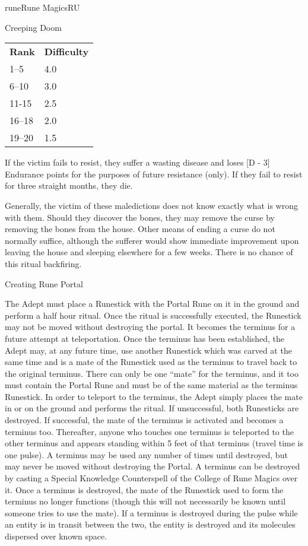 \begin{college}[1.1]{rune}{Rune Magics}{RU}
\begin{ritual}[R-2]{Creeping Doom}
\begin{effects}
\begin{tabular}{ll}
\textbf{Rank} & \textbf{Difficulty} \\
1--5	& 4.0 \\
6--10	& 3.0 \\
11-15	& 2.5 \\
16--18	& 2.0 \\
19--20	& 1.5 \\
\end{tabular}

If the victim fails to resist, they suffer a wasting disease and loses
[D - 3] Endurance points for the purposes of future resistance (only).
If they fail to resist for three straight months, they die.

Generally, the victim of these maledictions does not know exactly what
is wrong with them.  Should they discover the bones, they may remove
the curse by removing the bones from the house.  Other means of ending
a curse do not normally suffice, although the sufferer would show
immediate improvement upon leaving the house and sleeping elsewhere
for a few weeks.  There is no chance of this ritual backfiring.
\end{effects}
\end{ritual}

\begin{ritual}[R-3]{Creating Rune Portal}

\begin{effects}
The Adept must place a Runestick with the Portal Rune on it in the
ground and perform a half hour ritual.  Once the ritual is
successfully executed, the Runestick may not be moved without
destroying the portal.  It becomes the terminus for a future attempt
at teleportation. Once the terminus has been established, the Adept
may, at any future time, use another Runestick which was carved at the
same time and is a mate of the Runestick used as the terminus to
travel back to the original terminus.  There can only be one ``mate''
for the terminus, and it too must contain the Portal Rune and must be
of the same material as the terminus Runestick. In order to teleport
to the terminus, the Adept simply places the mate in or on the ground
and performs the ritual.  If unsuccessful, both Runesticks are
destroyed.  If successful, the mate of the terminus is activated and
becomes a terminus too.  Thereafter, anyone who touches one terminus
is teleported to the other terminus and appears standing within 5 feet
of that terminus (travel time is one pulse). A terminus may be used
any number of times until destroyed, but may never be moved without
destroying the Portal. A terminus can be destroyed by casting a
Special Knowledge Counterspell of the College of Rune Magics over
it. Once a terminus is destroyed, the mate of the Runestick used to
form the terminus no longer functions (though this will not
necessarily be known until someone tries to use the mate).  If a
terminus is destroyed during the pulse while an entity is in transit
between the two, the entity is destroyed and its molecules dispersed
over known space.


\end{effects}
\end{ritual}
\end{college}
